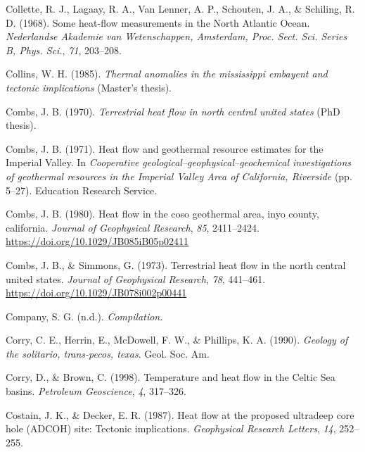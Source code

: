 \begin{CSLReferences}{1}{1}
\leavevmode{}%
Collette, R. J., Lagaay, R. A., Van Lenner, A. P., Schouten, J. A., \& Schiling, R. D. (1968). Some heat-flow measurements in the {North Atlantic Ocean}. \emph{{Nederlandse Akademie van Wetenschappen, Amsterdam}, Proc. Sect. Sci. Series B, Phys. Sci.}, \emph{71}, 203--208.

\leavevmode{}%
Collins, W. H. (1985). \emph{Thermal anomalies in the mississippi embayent and tectonic implications} (Master's thesis).

\leavevmode{}%
Combs, J. B. (1970). \emph{Terrestrial heat flow in north central united states} (PhD thesis).

\leavevmode{}%
Combs, J. B. (1971). Heat flow and geothermal resource estimates for the {Imperial Valley}. In \emph{Cooperative geological--geophysical--geochemical investigations of geothermal resources in the {Imperial Valley Area of California, Riverside}} (pp. 5--27). Education Research Service.

\leavevmode{}%
Combs, J. B. (1980). Heat flow in the coso geothermal area, inyo county, california. \emph{Journal of Geophysical Research}, \emph{85}, 2411--2424. \url{https://doi.org/10.1029/JB085iB05p02411}

\leavevmode{}%
Combs, J. B., \& Simmons, G. (1973). Terrestrial heat flow in the north central united states. \emph{Journal of Geophysical Research}, \emph{78}, 441--461. \url{https://doi.org/10.1029/JB078i002p00441}

\leavevmode{}%
Company, S. G. (n.d.). \emph{Compilation}.

\leavevmode{}%
Corry, C. E., Herrin, E., McDowell, F. W., \& Phillips, K. A. (1990). \emph{Geology of the solitario, trans-pecos, texas}. Geol. Soc. Am.

\leavevmode{}%
Corry, D., \& Brown, C. (1998). Temperature and heat flow in the {Celtic Sea} basins. \emph{Petroleum Geoscience}, \emph{4}, 317--326.

\leavevmode{}%
Costain, J. K., \& Decker, E. R. (1987). Heat flow at the proposed ultradeep core hole (ADCOH) site: Tectonic implications. \emph{Geophysical Research Letters}, \emph{14}, 252--255.


\end{CSLReferences}
